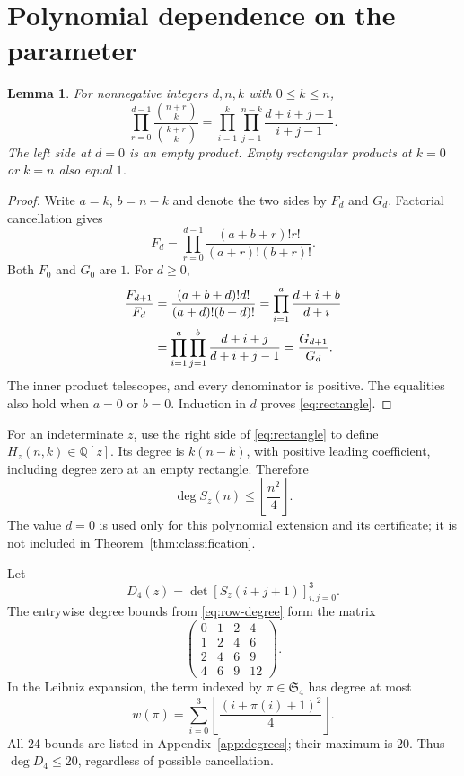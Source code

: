 \documentclass[11pt]{article}
\newtheorem{lemma}{Lemma}
\newcommand{\Q}{\mathbb Q}
\begin{document}
\section{Polynomial dependence on the parameter}

\begin{lemma}\label{lem:rectangle}
For nonnegative integers $d,n,k$ with $0\leq k\leq n$,
\begin{equation}\label{eq:rectangle}
 \prod_{r=0}^{d-1}\frac{\binom{n+r}{k}}{\binom{k+r}{k}}
 =\prod_{i=1}^{k}\prod_{j=1}^{n-k}
                    \frac{d+i+j-1}{i+j-1}.
\end{equation}
The left side at $d=0$ is an empty product. Empty rectangular
products at $k=0$ or $k=n$ also equal $1$.
\end{lemma}

\begin{proof}
Write $a=k$, $b=n-k$ and denote the two sides by $F_d$ and $G_d$.
Factorial cancellation gives
\[
 F_d=\prod_{r=0}^{d-1}\frac{(a+b+r)!r!}{(a+r)!(b+r)!}.
\]
Both $F_0$ and $G_0$ are $1$. For $d\geq0$,
\begin{align}
 \frac{F_{d+1}}{F_d}
 &=\frac{(a+b+d)!d!}{(a+d)!(b+d)!}
  =\prod_{i=1}^{a}\frac{d+i+b}{d+i}\notag\\
 &=\prod_{i=1}^{a}\prod_{j=1}^{b}
                    \frac{d+i+j}{d+i+j-1}
  =\frac{G_{d+1}}{G_d}.\label{eq:bridge-ratio}
\end{align}
The inner product telescopes, and every denominator is positive.
The equalities also hold when $a=0$ or $b=0$. Induction in $d$
proves \eqref{eq:rectangle}.
\end{proof}

For an indeterminate $z$, use the right side of \eqref{eq:rectangle}
to define $H_z(n,k)\in\Q[z]$. Its degree is $k(n-k)$, with
positive leading coefficient, including degree zero at an empty
rectangle. Therefore
\begin{equation}\label{eq:row-degree}
 \deg S_z(n)\leq\left\lfloor\frac{n^2}{4}\right\rfloor.
\end{equation}
The value $d=0$ is used only for this polynomial extension and its
certificate; it is not included in Theorem~\ref{thm:classification}.

Let
\begin{equation}\label{eq:D4}
 D_4(z)=\det[S_z(i+j+1)]_{i,j=0}^{3}.
\end{equation}
The entrywise degree bounds from \eqref{eq:row-degree} form the matrix
\begin{equation}\label{eq:degree-matrix}
 \begin{pmatrix}
 0&1&2&4\\1&2&4&6\\2&4&6&9\\4&6&9&12
 \end{pmatrix}.
\end{equation}
In the Leibniz expansion, the term indexed by $\pi\in\mathfrak S_4$
has degree at most
\[
 w(\pi)=\sum_{i=0}^{3}
           \left\lfloor\frac{(i+\pi(i)+1)^2}{4}\right\rfloor.
\]
All 24 bounds are listed in Appendix~\ref{app:degrees}; their maximum
is $20$. Thus $\deg D_4\leq20$, regardless of possible cancellation.
\end{document}
